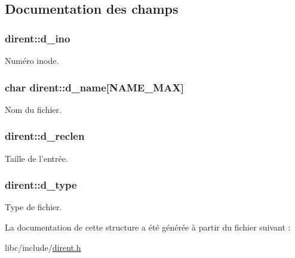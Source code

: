 \subsection{\-Documentation des champs}
\hypertarget{structdirent_a0ed2e5ea3c71500f628914bf3966e4ba}{
\subsubsection[{d\-\_\-ino}]{ {\bf dirent\-::d\-\_\-ino}}}\label{structdirent_a0ed2e5ea3c71500f628914bf3966e4ba}
\-Numéro inode. \hypertarget{structdirent_a7b4cbd53dc600257b2746225c8a8f3be}{
\subsubsection[{d\-\_\-name}]{\setlength{\rightskip}{0pt plus 5cm}char {\bf dirent\-::d\-\_\-name}\mbox{[}{\bf \-N\-A\-M\-E\-\_\-\-M\-A\-X}\mbox{]}}}\label{structdirent_a7b4cbd53dc600257b2746225c8a8f3be}
\-Nom du fichier. \hypertarget{structdirent_a7cc67dd4ba5a8bed7f107f249957688d}{
\subsubsection[{d\-\_\-reclen}]{ {\bf dirent\-::d\-\_\-reclen}}}\label{structdirent_a7cc67dd4ba5a8bed7f107f249957688d}
\-Taille de l'entrée. \hypertarget{structdirent_a948760e3b7f607213a19f85e7af15a32}{
\subsubsection[{d\-\_\-type}]{ {\bf dirent\-::d\-\_\-type}}}\label{structdirent_a948760e3b7f607213a19f85e7af15a32}
\-Type de fichier. 

\-La documentation de cette structure a été générée à partir du fichier suivant \-:\begin{DoxyCompactItemize}
\item 
libc/include/\hyperlink{dirent_8h}{dirent.\-h}\end{DoxyCompactItemize}
